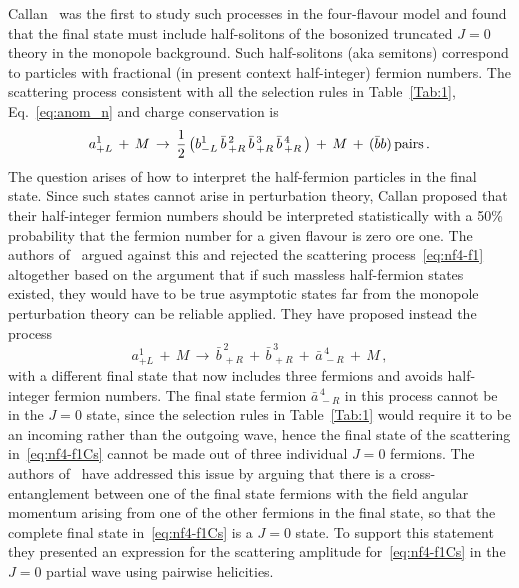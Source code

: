 \documentclass[a4paper,11pt]{article}
\begin{document}
Callan~\cite{Callan:1982au} was the first to study such processes in the four-flavour model and found that the final state must include half-solitons of the bosonized truncated $J=0$ theory in the monopole background. Such half-solitons (aka semitons) correspond to particles with fractional (in present context half-integer) fermion numbers. The scattering process consistent with all the selection rules in Table~\ref{Tab:1}, Eq.~\eqref{eq:anom_n} and charge conservation is~\cite{Callan:1982au}
\begin{equation}
\label{eq:nf4-f1}
 a_{+L}^1 \,+\,  M \,\to\, \frac{1}{2} \left(b_{-L}^1\,
  \bar{b}_{\,+R}^{\,2} \,
  \bar{b}_{\,+R}^{\,3} \,
  \bar{b}_{\,+R}^{\,4} \,\right) \,+\,  M \,+\, (\bar{b}b)\,{\rm pairs} \,.
\end{equation} 
The question arises of how to interpret the half-fermion particles in the final state. Since such states cannot arise 
in perturbation theory, Callan proposed that their half-integer fermion numbers should be interpreted statistically with a 50\% probability that the fermion number for a given flavour is zero ore one. The authors of~\cite{Csaki:2022qtz} argued against this and rejected the scattering process~\eqref{eq:nf4-f1} altogether based on the argument that if such massless half-fermion states existed, they would have to be true asymptotic states far from the monopole perturbation theory can be reliable applied. 
They have proposed instead the process~\cite{Csaki:2022qtz} 
\begin{equation}
\label{eq:nf4-f1Cs}
 a_{+L}^1 \,+\,  M \,\to\,
  \bar{b}_{\,+R}^{\,2} \,+\,
  \bar{b}_{\,+R}^{\,3} \,+\, 
  \bar{a}_{\,-R}^{\,4}  \,+\,  M  \,,
\end{equation} 
with a different final state that now includes three fermions and avoids half-integer fermion numbers. The final state fermion $\bar{a}_{\,-R}^{\,4}$ in this process 
cannot be in the $J=0$ state, since the selection rules in Table~\ref{Tab:1} would require it to be an incoming rather than the outgoing wave, hence the final state
of the scattering in~\eqref{eq:nf4-f1Cs} cannot be made out of three individual $J=0$ fermions. The authors of~\cite{Csaki:2022qtz}  have addressed this issue by arguing that there is a cross-entanglement between one of the final state fermions with the field angular momentum arising from one of the other fermions in the final state, so that the complete final state in~\eqref{eq:nf4-f1Cs} is a $J=0$ state. To support this statement they presented an expression for the scattering amplitude for~\eqref{eq:nf4-f1Cs} in the $J=0$ partial wave using pairwise helicities.
\end{document}
